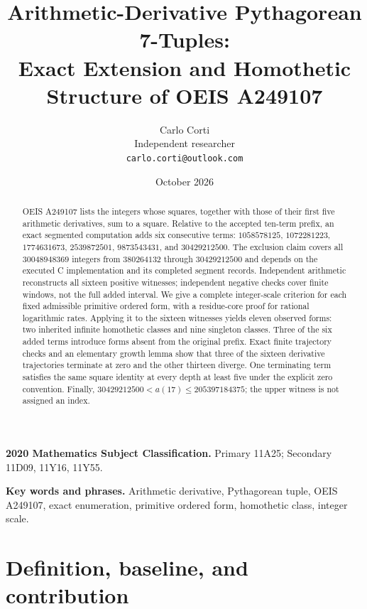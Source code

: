 \documentclass[11pt,a4paper]{article}
\title{Arithmetic-Derivative Pythagorean 7-Tuples:\\Exact Extension and Homothetic Structure of OEIS A249107}
\author{Carlo Corti\\Independent researcher\\\texttt{carlo.corti@outlook.com}}
\date{October 2026}
\theoremstyle{definition}
\theoremstyle{remark}
\begin{document}
\maketitle
\begin{abstract}
OEIS A249107 lists the integers whose squares, together with those of their
first five arithmetic derivatives, sum to a square. Relative to the accepted
ten-term prefix, an exact segmented computation adds six consecutive terms:
$1058578125$, $1072281223$, $1774631673$, $2539872501$, $9873543431$, and
$30429212500$. The exclusion claim covers all $30048948369$ integers from
$380264132$ through $30429212500$ and depends on the executed C implementation
and its completed segment records. Independent arithmetic reconstructs all
sixteen positive witnesses; independent negative checks cover finite windows,
not the full added interval. We give a complete integer-scale criterion for
each fixed admissible primitive ordered form, with a residue-core proof for
rational logarithmic rates. Applying it to the sixteen witnesses yields eleven
observed forms: two inherited infinite homothetic classes and nine singleton
classes. Three of the six added terms introduce forms absent from the original
prefix. Exact finite trajectory checks and an elementary growth lemma show
that three of the sixteen derivative trajectories terminate at zero and the
other thirteen diverge. One terminating term satisfies the same square identity
at every depth at least five under the explicit zero convention. Finally,
$30429212500<a(17)\le205397184375$; the upper witness is not assigned an index.
\end{abstract}

\noindent\textbf{2020 Mathematics Subject Classification.}
Primary 11A25; Secondary 11D09, 11Y16, 11Y55.

\smallskip
\noindent\textbf{Key words and phrases.}
Arithmetic derivative, Pythagorean tuple, OEIS A249107, exact enumeration,
primitive ordered form, homothetic class, integer scale.

\section{Definition, baseline, and contribution}\label{sec:intro}
\end{document}
